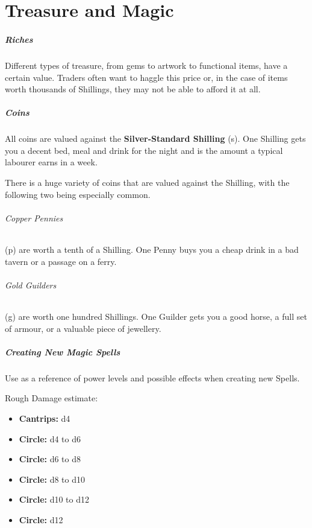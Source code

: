 \documentclass[itdr/core]{subfiles}
\begin{document}
\chapter{Treasure and Magic}
\label{ch:treasure_and_magic}

\paragraph{Riches}
Different types of treasure, from gems to artwork to functional items, have a certain value. Traders often want to haggle this price or, in the case of items worth thousands of Shillings, they may not be able to afford it at all.

\paragraph{Coins}
All coins are valued against the \textbf{Silver-Standard Shilling} (s). One Shilling gets you a decent bed, meal and drink for the night and is the amount a typical labourer earns in a week.

There is a huge variety of coins that are valued against the Shilling, with the following two being especially common.\tight

\subparagraph{Copper Pennies} (p) are worth a tenth of a Shilling. One Penny buys you a cheap drink in a bad tavern or a passage on a ferry.

\subparagraph{Gold Guilders} (g) are worth one hundred Shillings. One Guilder gets you a good horse, a full set of armour, or a valuable piece of jewellery.

\vfill

\paragraph{Creating New Magic Spells}
Use \textbf{} as a reference of power levels and possible effects when creating new Spells.

Rough Damage estimate:
\begin{itemize}
	\item \textbf{Cantrips:} d4
	\item \textbf{ Circle:} d4 to d6
	\item \textbf{ Circle:} d6 to d8
	\item \textbf{ Circle:} d8 to d10
	\item \textbf{ Circle:} d10 to d12
	\item \textbf{ Circle:} d12
\end{itemize}
\end{document}
